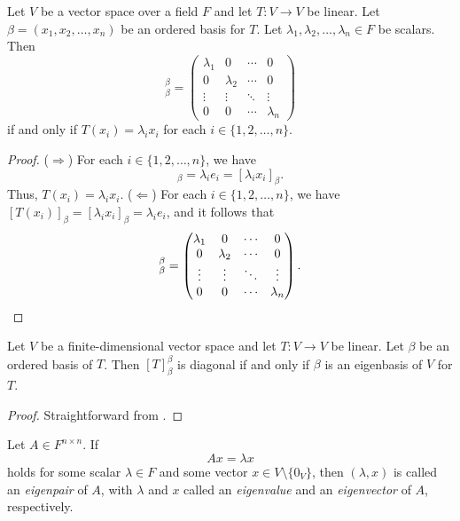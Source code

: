 \begin{theorem}
  \label{thm:diagonalization}
  Let $V$ be a vector space over a field $F$ and let $T: V \to V$ be linear.
  Let $\beta = (x_1, x_2, \dots, x_n)$ be an ordered basis for $T$.
  Let $\lambda_1, \lambda_2, \dots, \lambda_n \in F$ be scalars.
  Then
  \begin{equation*}
    [T]_\beta^\beta =
    \begin{pmatrix}
      \lambda_1 & 0 & \cdots & 0 \\
      0 & \lambda_2 & \cdots & 0 \\
      \vdots & \vdots & \ddots & \vdots \\
      0 & 0 & \cdots & \lambda_n
    \end{pmatrix}
  \end{equation*}
  if and only if
  $T(x_i) = \lambda_ix_i$ for each $i \in \{1, 2, \dots, n\}$.
\end{theorem}
\begin{proof}
  ($\Rightarrow$)
  For each $i \in \{1, 2, \dots, n\}$, we have
  \begin{equation*}
    [T(x_i)]_\beta = \lambda_ie_i = [\lambda_ix_i]_\beta.
  \end{equation*}
  Thus, $T(x_i) = \lambda_ix_i$.
  ($\Leftarrow$)
  For each $i \in \{1, 2, \dots, n\}$, we have
  $[T(x_i)]_\beta = [\lambda_ix_i]_\beta = \lambda_ie_i$,
  and it follows that
  \begin{equation*}
    [T]_\beta^\beta =
    \begin{pmatrix}
      \lambda_1 & 0 & \cdots & 0 \\
      0 & \lambda_2 & \cdots & 0 \\
      \vdots & \vdots & \ddots & \vdots \\
      0 & 0 & \cdots & \lambda_n
    \end{pmatrix}.
    \qedhere
  \end{equation*}
\end{proof}

\begin{corollary}
  Let $V$ be a finite-dimensional vector space and let $T: V \to V$ be linear.
  Let $\beta$ be an ordered basis of $T$.
  Then $[T]_\beta^\beta$ is diagonal if and only if $\beta$ is an eigenbasis
  of $V$ for $T$.
\end{corollary}
\begin{proof}
  Straightforward from .
\end{proof}

\begin{definition}
  Let $A \in F^{n \times n}$.
  If
  \begin{equation*}
    Ax = \lambda x
  \end{equation*}
  holds for some scalar $\lambda \in F$ and some vector
  $x \in V \setminus \{0_V\}$, then $(\lambda, x)$ is called an
  \emph{eigenpair} of $A$, with $\lambda$ and $x$ called an
  \emph{eigenvalue} and an \emph{eigenvector} of $A$, respectively.
\end{definition}

